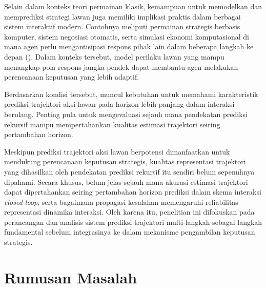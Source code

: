 Selain dalam konteks teori permainan klasik, kemampuan untuk memodelkan dan memprediksi strategi lawan juga memiliki implikasi praktis dalam berbagai sistem interaktif modern. Contohnya meliputi permainan strategis berbasis komputer, sistem negosiasi otomatis, serta simulasi ekonomi komputasional di mana agen perlu mengantisipasi respons pihak lain dalam beberapa langkah ke depan (\cite{albrecht_autonomous_2024}). Dalam konteks tersebut, model perilaku lawan yang mampu menangkap pola respons jangka pendek dapat membantu agen melakukan perencanaan keputusan yang lebih adaptif.

Berdasarkan kondisi tersebut, muncul kebutuhan untuk memahami karakteristik prediksi trajektori aksi lawan pada horizon lebih panjang dalam interaksi berulang. Penting pula untuk mengevaluasi sejauh mana pendekatan prediksi rekursif mampu mempertahankan kualitas estimasi trajektori seiring pertambahan horizon.

Meskipun prediksi trajektori aksi lawan berpotensi dimanfaatkan untuk mendukung perencanaan keputusan strategis, kualitas representasi trajektori yang dihasilkan oleh pendekatan prediksi rekursif itu sendiri belum sepenuhnya dipahami. Secara khusus, belum jelas sejauh mana akurasi estimasi trajektori dapat dipertahankan seiring pertambahan horizon prediksi dalam skema interaksi \textit{closed-loop}, serta bagaimana propagasi kesalahan memengaruhi reliabilitas representasi dinamika interaksi. Oleh karena itu, penelitian ini difokuskan pada perancangan dan analisis sistem prediksi trajektori multi-langkah sebagai langkah fundamental sebelum integrasinya ke dalam mekanisme pengambilan keputusan strategis.

\section{Rumusan Masalah}



